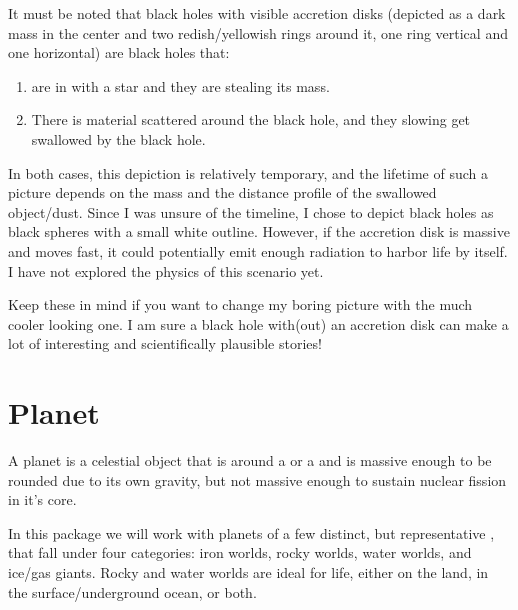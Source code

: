 \documentclass[letterpaper,10pt,english]{sphinxmanual}
\begin{document}
\sphinxAtStartPar
It must be noted that black holes with visible accretion disks (depicted as a dark mass in the center and
two redish/yellowish rings around it, one ring vertical and one horizontal) are black holes that:
\begin{enumerate}
%
\item {} 
\sphinxAtStartPar
are in {\hyperref[\detokenize{quantities/orbital/contact:id1}]{}} with a star and they are stealing its mass.

\item {} 
\sphinxAtStartPar
There is material scattered around the black hole, and they slowing get swallowed by the black hole.

\end{enumerate}

\sphinxAtStartPar
In both cases, this depiction is relatively temporary, and the lifetime of such a picture depends
on the mass and the distance profile of the swallowed object/dust.
Since I was unsure of the timeline, I chose to depict black holes as black spheres with a small white outline.
However, if the accretion disk is massive and moves fast, it could potentially emit enough radiation to harbor
life by itself. I have not explored the physics of this scenario yet.

\sphinxAtStartPar
Keep these in mind if you want to change my boring picture with the much cooler looking one.
I am sure a black hole with(out) an accretion disk can make a lot of interesting and scientifically plausible
stories!


\section{Planet}
\label{\detokenize{celestial_bodies/planet:planet}}\label{\detokenize{celestial_bodies/planet::doc}}\label{\detokenize{celestial_bodies/planet:id1}}
\sphinxAtStartPar
A planet is a celestial object that is {\hyperref[\detokenize{quantities/orbital/orbital:id1}]{}}
around a {\hyperref[\detokenize{celestial_bodies/star:id1}]{}} or a {\hyperref[\detokenize{celestial_systems/binary_system:id1}]{}}
and is massive enough to be rounded due to its own gravity, but not massive
enough to sustain nuclear fission in it’s core.

\sphinxAtStartPar
In this package we will work with planets of a few distinct, but representative
{\hyperref[\detokenize{quantities/material/composition_type:id1}]{}}, that fall under four categories:
iron worlds, rocky worlds, water worlds, and ice/gas giants. Rocky and water
worlds are ideal for life, either on the land,
in the surface/underground ocean, or both.
\end{document}
